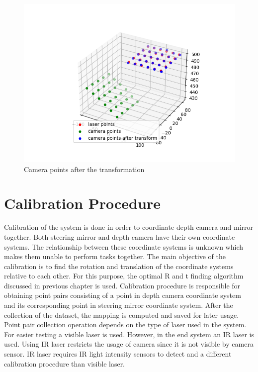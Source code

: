 \begin{figure}[!htb]\centering
    \includegraphics*[width = 16cm]{bilder/project/mapping2.png}
    \caption{Camera points after the transformation }
    \label{fig:mapping2}
\end{figure}


\section{Calibration Procedure}
\label{sec:Calibration Procedure}


Calibration of the system is done in order to coordinate depth 
camera and mirror together. Both steering mirror and depth 
camera have their own coordinate systems. The relationship 
between these coordinate systems is unknown which makes them 
unable to perform tasks together. The main objective of the 
calibration is to find the rotation and translation of the 
coordinate systems relative to each other.  For this purpose, 
the optimal R and t finding algorithm discussed in previous 
chapter is used. 
Calibration procedure is responsible for obtaining point pairs 
consisting of a point in depth camera coordinate system and its 
corresponding point in steering mirror coordinate system. After 
the collection of the dataset, the mapping is computed and saved 
for later usage. Point pair collection operation depends on the 
type of laser used in the system. For easier testing a visible 
laser is used. However, in the end system an IR laser is used. 
Using IR laser restricts the usage of camera since it is not 
visible by camera sensor. IR laser requires IR light intensity 
sensors to detect and a different calibration procedure than 
visible laser.  


